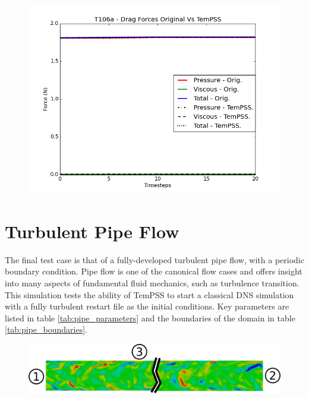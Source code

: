 \documentclass[11pt, a4paper]{report}
\begin{document}
\begin{figure}[htb!]
 \centering
 \includegraphics[width=.95\linewidth,  clip=true, trim = 0cm 0cm 0cm 0cm]{drag_t106a}
 \label{fig:drag_lift_t106a}
\end{figure}

\section{Turbulent Pipe Flow}
The final test case is that of a fully-developed turbulent pipe flow, with a periodic boundary condition. Pipe flow is one of the canonical flow cases and offers insight into many aspects of fundamental fluid mechanics, such as turbulence transition. This simulation tests the ability of TemPSS to start a classical DNS simulation with a fully turbulent restart file as the initial conditions. Key parameters are listed in table \ref{tab:pipe_parameters} and the boundaries of the domain in table \ref{tab:pipe_boundaries}.

\begin{figure}[htb!]
 \centering
 \includegraphics[width=.95\linewidth,  clip=true, trim = 0cm 0cm 0cm 0cm]{pipe_domain_real}
 \label{fig:pipe_domain}
\end{figure}
\end{document}
